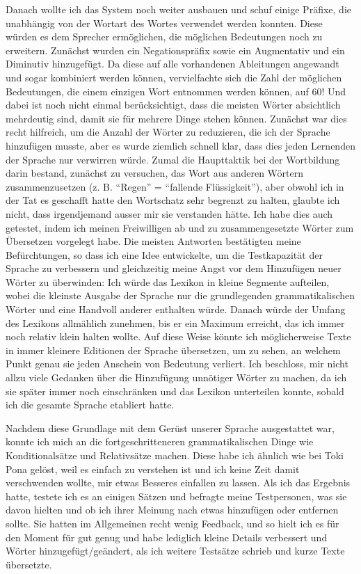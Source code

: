 \documentclass{article}
\begin{document}
Danach wollte ich das System noch weiter ausbauen und schuf einige Präfixe, die unabhängig von der Wortart des Wortes
verwendet werden konnten. Diese würden es dem Sprecher ermöglichen, die möglichen Bedeutungen noch zu erweitern.
Zunächst wurden ein Negationspräfix sowie ein Augmentativ und ein Diminutiv hinzugefügt. Da diese auf alle vorhandenen
Ableitungen angewandt und sogar kombiniert werden können, vervielfachte sich die Zahl der möglichen Bedeutungen,
die einem einzigen Wort entnommen werden können, auf 60! Und dabei ist noch nicht einmal berücksichtigt,
dass die meisten Wörter absichtlich mehrdeutig sind, damit sie für mehrere Dinge stehen können. Zunächst war dies recht hilfreich,
um die Anzahl der Wörter zu reduzieren, die ich der Sprache hinzufügen musste, aber es wurde ziemlich schnell klar,
dass dies jeden Lernenden der Sprache nur verwirren würde. Zumal die Haupttaktik bei der Wortbildung darin bestand,
zunächst zu versuchen, das Wort aus anderen Wörtern zusammenzusetzen (z. B. ``Regen'' = ``fallende Flüssigkeit''),
aber obwohl ich in der Tat es geschafft hatte den Wortschatz sehr begrenzt zu halten, glaubte ich nicht, dass irgendjemand ausser mir sie
verstanden hätte. Ich habe dies auch getestet, indem ich meinen Freiwilligen ab und zu zusammengesetzte
Wörter zum Übersetzen vorgelegt habe. Die meisten Antworten bestätigten meine Befürchtungen, so dass ich eine Idee entwickelte,
um die Testkapazität der Sprache zu verbessern und gleichzeitig meine Angst vor dem Hinzufügen neuer Wörter zu überwinden:
Ich würde das Lexikon in kleine Segmente aufteilen, wobei die kleinste Ausgabe der Sprache nur die grundlegenden
grammatikalischen Wörter und eine Handvoll anderer enthalten würde. Danach würde der Umfang des Lexikons allmählich zunehmen,
bis er ein Maximum erreicht, das ich immer noch relativ klein halten wollte. Auf diese Weise könnte ich möglicherweise
Texte in immer kleinere Editionen der Sprache übersetzen, um zu sehen, an welchem Punkt genau sie jeden Anschein von
Bedeutung verliert. Ich beschloss, mir nicht allzu viele Gedanken über die Hinzufügung unnötiger Wörter zu machen,
da ich sie später immer noch einschränken und das Lexikon unterteilen konnte, sobald ich die gesamte Sprache etabliert hatte.

Nachdem diese Grundlage mit dem Gerüst unserer Sprache ausgestattet war, konnte ich mich an die fortgeschritteneren
grammatikalischen Dinge wie Konditionalsätze und Relativsätze machen. Diese habe ich ähnlich wie bei Toki Pona gelöst,
weil es einfach zu verstehen ist und ich keine Zeit damit verschwenden wollte, mir etwas Besseres einfallen zu lassen.
Als ich das Ergebnis hatte, testete ich es an einigen Sätzen und befragte meine Testpersonen, was sie davon hielten und
ob ich ihrer Meinung nach etwas hinzufügen oder entfernen sollte. Sie hatten im Allgemeinen recht wenig Feedback,
und so hielt ich es für den Moment für gut genug und habe lediglich kleine Details verbessert und Wörter hinzugefügt/geändert,
als ich weitere Testsätze schrieb und kurze Texte übersetzte.
\end{document}
